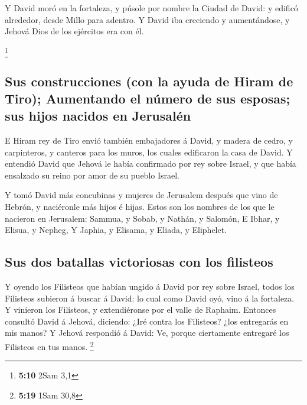  Y David moró en la fortaleza, y púsole por nombre la
Ciudad de David: y edificó alrededor, desde Millo para adentro.
 Y David iba creciendo y aumentándose, y Jehová Dios de
los ejércitos era con él.

\footnote{\textbf{5:10} 2Sam 3,1}

\hypertarget{sus-construcciones-con-la-ayuda-de-hiram-de-tiro-aumentando-el-nuxfamero-de-sus-esposas-sus-hijos-nacidos-en-jerusaluxe9n}{%
\subsection{Sus construcciones (con la ayuda de Hiram de Tiro);
Aumentando el número de sus esposas; sus hijos nacidos en
Jerusalén}\label{sus-construcciones-con-la-ayuda-de-hiram-de-tiro-aumentando-el-nuxfamero-de-sus-esposas-sus-hijos-nacidos-en-jerusaluxe9n}}

 E Hiram rey de Tiro envió también embajadores á David, y
madera de cedro, y carpinteros, y canteros para los muros, los cuales
edificaron la casa de David.  Y entendió David que Jehová
le había confirmado por rey sobre Israel, y que había ensalzado su reino
por amor de su pueblo Israel.

 Y tomó David más concubinas y mujeres de Jerusalem
después que vino de Hebrón, y naciéronle más hijos é hijas.
 Estos son los nombres de los que le nacieron en
Jerusalem: Sammua, y Sobab, y Nathán, y Salomón,  E
Ibhar, y Elisua, y Nepheg,  Y Japhia, y Elisama, y
Eliada, y Eliphelet.

\hypertarget{sus-dos-batallas-victoriosas-con-los-filisteos}{%
\subsection{Sus dos batallas victoriosas con los
filisteos}\label{sus-dos-batallas-victoriosas-con-los-filisteos}}

 Y oyendo los Filisteos que habían ungido á David por rey
sobre Israel, todos los Filisteos subieron á buscar á David: lo cual
como David oyó, vino á la fortaleza.  Y vinieron los
Filisteos, y extendiéronse por el valle de Raphaim. 
Entonces consultó David á Jehová, diciendo: ¿Iré contra los Filisteos?
¿los entregarás en mis manos? Y Jehová respondió á David: Ve, porque
ciertamente entregaré los Filisteos en tus manos. \footnote{\textbf{5:19}
  1Sam 30,8}

